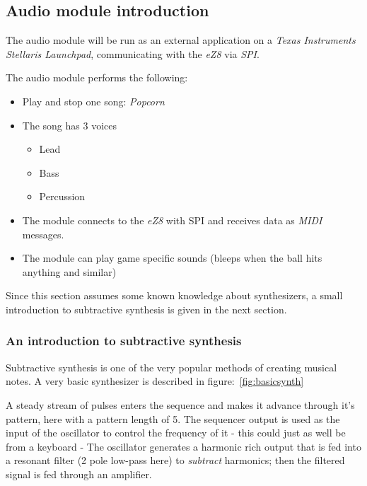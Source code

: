 \subsection{Audio module introduction}
The audio module will be run as an external application on a \emph{Texas
Instruments} \emph{Stellaris Launchpad}, communicating with the \emph{eZ8} via
\emph{SPI}.

The audio module performs the following:
\begin{itemize}
  \item Play and stop one song: \emph{Popcorn}
  \item The song has 3 voices
  \begin{itemize}
    \item Lead
    \item Bass
    \item Percussion
  \end{itemize}
  \item The module connects to the \emph{eZ8} with SPI and receives data as
  \emph{MIDI} messages.
  \item The module can play game specific sounds (bleeps when the ball hits
  anything and similar)
\end{itemize}

Since this section assumes some known knowledge about synthesizers, a small
introduction to subtractive synthesis is given in the next section.

\subsubsection{An introduction to subtractive synthesis}\label{synthxp}
Subtractive synthesis is one of the very popular methods of creating musical
notes. A very basic synthesizer is described in figure:~\ref{fig:basicsynth}


A steady stream of pulses enters the sequence and makes it advance through it's
pattern, here with a pattern length of 5. The sequencer output is used as the
input of the oscillator to control the frequency of it - this could just as well
be from a keyboard - The oscillator generates a harmonic rich output that is fed
into a resonant filter (2 pole low-pass here) to \emph{subtract} harmonics; then
the filtered signal is fed through an amplifier.

